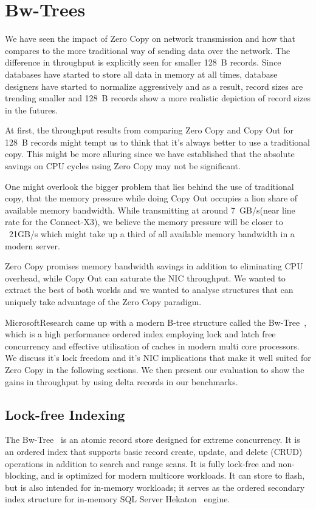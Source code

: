 
\chapter{Bw-Trees}
\label{chap:bw-tree}

We have seen the impact of Zero Copy on network transmission and how that 
compares to the more traditional way of sending data over the network. The difference
in throughput is explicitly seen for smaller 128~B records. Since databases have started
to store all data in memory at all times, database designers have started to normalize 
aggressively and as a result, record sizes are trending smaller and 128~B records show
a more realistic depiction of record sizes in the futures.

At first, the throughput results from comparing Zero Copy and Copy Out for 128~B 
records might tempt  us to think that
it's always better to use a traditional copy. This might be more alluring since we 
 have established that the absolute savings on CPU cycles using Zero Copy may not be 
 significant. 

 One might overlook the bigger problem that lies behind the use of traditional
 copy, that the memory pressure while doing Copy Out occupies a lion share of available
 memory bandwidth. While transmitting at around 7~GB/s(near line rate for the Connect-X3\textregistered),
  we believe the memory pressure will be closer to ~21GB/s which might take up a third of
  all available memory bandwidth in a modern server.

Zero Copy promises memory bandwidth savings in addition to eliminating CPU overhead, 
while Copy Out can saturate the NIC throughput. We wanted to extract the best of both worlds 
and we wanted to analyse structures that can uniquely take advantage of the 
Zero Copy paradigm. 

Microsoft\textregistered Research came up with a modern B-tree structure called 
the Bw-Tree~\cite{bw-tree}, which is a high performance ordered index employing
 lock and latch free concurrency and effective utilisation of caches in 
 modern multi core processors. We discuss it's lock freedom and it's NIC implications
 that make it well suited for Zero Copy in the following sections. We then present
 our evaluation to show the gains in throughput by using delta records in our benchmarks. 


\section{Lock-free Indexing}
The Bw-Tree~\cite{bw-tree} is an atomic record store designed for extreme
concurrency. It is an ordered index that supports basic record create, update,
and delete (CRUD) operations in addition to search and range scans.  It is
fully lock-free and non-blocking, and is optimized for modern multicore
workloads. It can store to flash, but is also intended for in-memory
workloads; it serves as the ordered secondary index structure for in-memory SQL
Server Hekaton~\cite{hekaton} engine.


